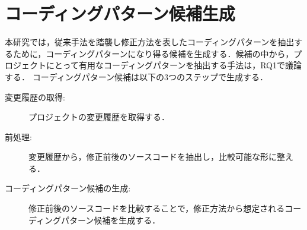 \documentclass[twocolumn]{jarticle} %
\begin{document}
\section{コーディングパターン候補生成}
本研究では，従来手法を踏襲し修正方法を表したコーディングパターンを抽出するために，コーディングパターンになり得る候補を生成する．候補の中から，プロジェクトにとって有用なコーディングパターンを抽出する手法は，RQ1で議論する．
コーディングパターン候補は以下の3つのステップで生成する．
\begin{description}
    \item[変更履歴の取得:] プロジェクトの変更履歴を取得する．
    \item[前処理:] 変更履歴から，修正前後のソースコードを抽出し，比較可能な形に整える． 
    \item[コーディングパターン候補の生成:]修正前後のソースコードを比較することで，修正方法から想定されるコーディングパターン候補を生成する． 
\end{description}
\end{document}
